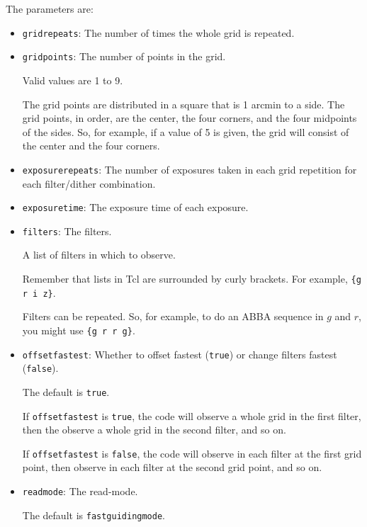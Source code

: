 The parameters are:
\begin{itemize}
    \item \verb|gridrepeats|: The number of times the whole grid is repeated.

    \item \verb|gridpoints|: The number of points in the grid.
    
    Valid values are 1 to 9.
    
    The grid points are distributed in a square that is 1 arcmin to a side. The grid points, in order, are the center, the four corners, and the four midpoints of the sides. So, for example, if a value of 5 is given, the grid will consist of the center and the four corners.
    
    \item \verb|exposurerepeats|: The number of exposures taken in each grid repetition for each filter/dither combination.
    
    \item \verb|exposuretime|: The exposure time of each exposure.
    
    \item \verb|filters|: The filters.
    
    A list of filters in which to observe. 
    
    Remember that lists in Tcl are surrounded by curly brackets. For example, \verb|{g r i z}|.
    
    Filters can be repeated. So, for example, to do an ABBA sequence in $g$ and $r$, you might use \verb|{g r r g}|.
    
    \item \verb|offsetfastest|: Whether to offset fastest (\verb|true|) or change filters fastest (\verb|false|).
    
    The default is \verb|true|.
    
    If \verb|offsetfastest| is \verb|true|, the code will observe a whole grid in the first filter, then the observe a whole grid in the second filter, and so on.
    
    If \verb|offsetfastest| is \verb|false|, the code will observe in each filter at the first grid point, then observe in each filter at the second grid point, and so on.
    
    \item \verb|readmode|: The read-mode.
    
    The default is \verb|fastguidingmode|.
\end{itemize}

